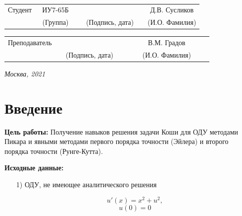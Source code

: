 \documentclass[14pt, a4paper]{extarticle}
\begin{document}
	
	\noindent
	
	\noindent
	\\
	
	\vspace{1.5cm}
	\noindent
	\begin{tabular}{l c c c c c}
		Студент      & ~ИУ7-65Б~               & \hspace{2.5cm} & \hspace{2cm}                 & &  Д.В. 
		Сусликов \\\cline{2-2}\cline{4-4} \cline{6-6} 
		\hspace{3cm} & {\footnotesize(Группа)} &                & {\footnotesize(Подпись, дата)} & & {\footnotesize(И.О. Фамилия)}
	\end{tabular}
	
	\noindent
	\begin{tabular}{l c c c c}
		Преподаватель & \hspace{5cm}   & \hspace{2cm}                 & & ~~~~~~В.М. Градов~~~~~~\\\cline{3-3} \cline{5-5} 
		\hspace{3cm}  &                & {\footnotesize(Подпись, дата)} & & {\footnotesize(И.О. Фамилия)}
	\end{tabular}
	
	\vspace{0.6cm}
	\begin{center}	
		\vfill
		\large \textit {Москва, 2021}
	\end{center}
	
	\thispagestyle {empty}
	\pagebreak
	
	\clearpage
		
	\clearpage
	\section*{Введение}
	\textbf{Цель работы:} Получение навыков решения задачи Коши для ОДУ методами Пикара и
	явными методами первого порядка точности (Эйлера) и второго порядка точности (Рунге-Кутта).\par
	\textbf{Исходные данные:}
	\begin{enumerate}
		\item[1)] ОДУ, не имеющее аналитического решения\par
		$$u'(x) = x^2 + u^2, $$
		$$u(0) = 0 $$
	\end{enumerate}
	\par
	
\end{document}
